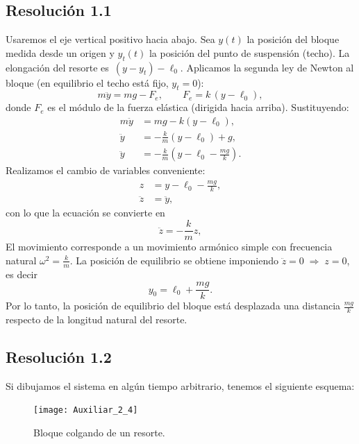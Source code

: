 \documentclass[
  11pt,
  letterpaper,
   addpoints,
   answers
  ]{exam}
\begin{document}
\begin{questions}
\begin{solution}
  \subsection*{Resolución 1.1}
  Usaremos el eje vertical positivo hacia abajo. Sea $y(t)$ la posición del bloque medida desde un origen y $y_t(t)$ la posición del punto de suspensión (techo). La elongación del resorte es $\,(y-y_t)-\ell_0$. Aplicamos la segunda ley de Newton al bloque (en equilibrio el techo está fijo, $y_t=0$):
  \begin{equation}
    m\ddot{y} = mg - F_e, 
    \qquad F_e = k\,(y - \ell_0),
  \end{equation}
  donde $F_e$ es el módulo de la fuerza elástica (dirigida hacia arriba). Sustituyendo:
  \begin{align}
    m\ddot{y} &= mg - k(y - \ell_0), \\
    \ddot{y} &= -\frac{k}{m}(y - \ell_0) + g, \\
    \ddot{y} &= -\frac{k}{m}\left(y - \ell_0 - \frac{mg}{k}\right).
  \end{align}
Realizamos el cambio de variables conveniente:
  \begin{align}
    z &= y - \ell_0 - \frac{mg}{k}, \\
    \ddot{z} &= \ddot{y},
  \end{align}
  con lo que la ecuación se convierte en
  \begin{equation}
    \ddot{z} = -\frac{k}{m}z,
  \end{equation}
  El movimiento corresponde a un movimiento armónico simple con frecuencia natural $\omega^2 = \tfrac{k}{m}$. La posición de equilibrio se obtiene imponiendo $\ddot{z}=0 \;\Rightarrow\; z=0$,
  es decir
  \begin{equation}
    y_0 = \ell_0 + \frac{mg}{k}.
  \end{equation}
Por lo tanto, la posición de equilibrio del bloque está desplazada una distancia $\tfrac{mg}{k}$ respecto de la longitud natural del resorte.

  \subsection*{Resolución 1.2}

Si dibujamos el sistema en algún tiempo arbitrario, tenemos el siguiente esquema:
\begin{figure}[H]
  \centering
\texttt{[image: Auxiliar\_2\_4]}
  \caption{Bloque colgando de un resorte.}
  \label{fig:spring_block}
\end{figure}


\end{solution}
\end{questions}
\end{document}
